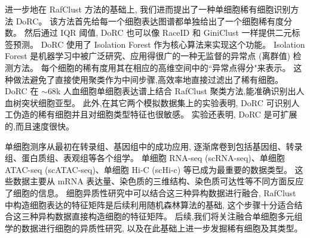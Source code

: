
进一步地在 RafClust 方法的基础上, 我们进而提出了一种单细胞稀有细胞识别方法 DoRC。
该方法首先给每一个细胞表达图谱都单独给出了一个细胞稀有度分数。
然后通过 IQR 阈值, DoRC 也可以像 RaceID 和 GiniClust 一样提供二元标签预测。
DoRC 使用了 Isolation Forest 作为核心算法来实现这个功能。
Isolation Forest 是机器学习中被广泛研究、应用得很广的一种无监督的异常点 (离群值) 检测方法。
每个细胞的稀有度用其在相应的高维空间中的``异常点得分"来表示。
这种做法避免了直接使用聚类作为中间步骤,高效率地直接过滤出了稀有细胞。
DoRC 在 ${\sim}68$k 人血细胞单细胞表达谱上结合 RafClust 聚类方法,能准确识别出人血树突状细胞亚型。
此外,在其它两个模拟数据集上的实验表明, DoRC 可识别人工伪造的稀有细胞并且对细胞类型特征也很敏感。
实验还表明, DoRC 是可扩展的,而且速度很快。

单细胞测序从最初在转录组、基因组中的成功应用, 逐渐席卷到包括基因组、转录组、蛋白质组、表观组等各个组学。
单细胞 RNA-seq (scRNA-seq)、单细胞 ATAC-seq (scATAC-seq)、单细胞 Hi-C (scHi-c) 等已成为最重要的数据类型。
这些数据主要从 mRNA 表达量、染色质的三维结构、染色质可达性等不同方面反应了细胞的信息。
细胞异质性研究中可以结合这三种异构数据进行融合, RafClust 中构造细胞表达的特征矩阵是后续利用随机森林算法的基础,
这个步骤十分适合结合这三种异构数据直接构造细胞的特征矩阵。
后续,我们将关注融合单细胞多元组学的数据进行细胞的异质性研究, 以及在此基础上进一步发掘稀有细胞及其类型。

